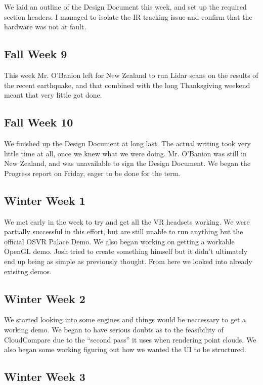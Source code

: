 \documentclass{article}
\begin{document}
We laid an outline of the Design Document this week, and set up the required section headers. 
I managed to isolate the IR tracking issue and confirm that the hardware was not at fault.

\subsection{Fall Week 9}

This week Mr. O'Banion left for New Zealand to run Lidar scans on the results of the recent earthquake, and that combined with the long Thanksgiving weekend meant that very little got done.

\subsection{Fall Week 10}

We finished up the Design Document at long last. The actual writing took very little time at all, once we knew what we were doing. 
Mr. O'Banion was still in New Zealand, and was unavailable to sign the Design Document. 
We began the Progress report on Friday, eager to be done for the term.

\subsection{Winter Week 1}

We met early in the week to try and get all the VR headsets working. 
We were partially successful in this effort, but are still unable to run anything but the official OSVR Palace Demo.
We also began working on getting a workable OpenGL demo.
Josh tried to create something himself but it didn't ultimately end up being as simple as previously thought.
From here we looked into already exisitng demos.

\subsection{Winter Week 2}

We started looking into some engines and things would be neccessary to get a working demo.
We began to have serious doubts as to the feasibility of CloudCompare due to the “second pass” it uses when rendering point clouds.
We also began some working figuring out how we wanted the UI to be structured.

\subsection{Winter Week 3}
\end{document}
